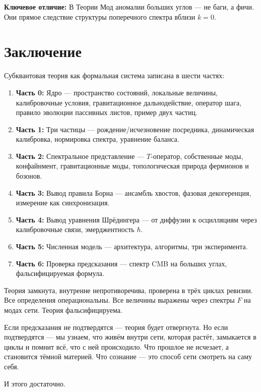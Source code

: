\documentclass[11pt,a4paper]{article}
\theoremstyle{definition}
\begin{document}
\textbf{Ключевое отличие:} В Теории Мод аномалии больших углов --- не баги, а фичи. Они прямое следствие структуры поперечного спектра вблизи $k = 0$.

\newpage
\section*{Заключение}

Субквантовая теория как формальная система записана в шести частях:

\begin{enumerate}
    \item \textbf{Часть 0:} Ядро --- пространство состояний, локальные величины, калибровочные условия, гравитационное дальнодействие, оператор шага, правило эволюции пассивных листов, пример двух частиц.
    \item \textbf{Часть 1:} Три частицы --- рождение/исчезновение посредника, динамическая калибровка, нормировка спектра, уравнение баланса.
    \item \textbf{Часть 2:} Спектральное представление --- $T$-оператор, собственные моды, конфайнмент, гравитационные моды, топологическая природа фермионов и бозонов.
    \item \textbf{Часть 3:} Вывод правила Борна --- ансамбль хвостов, фазовая декогеренция, измерение как синхронизация.
    \item \textbf{Часть 4:} Вывод уравнения Шрёдингера --- от диффузии к осцилляциям через калибровочные связи, эмерджентность $\hbar$.
    \item \textbf{Часть 5:} Численная модель --- архитектура, алгоритмы, три эксперимента.
    \item \textbf{Часть 6:} Проверка предсказания --- спектр CMB на больших углах, фальсифицируемая формула.
\end{enumerate}

Теория замкнута, внутренне непротиворечива, проверена в трёх циклах ревизии. Все определения операциональны. Все величины выражены через спектры $F$ на модах сети. Теория фальсифицируема.

Если предсказания не подтвердятся --- теория будет отвергнута. Но если подтвердятся --- мы узнаем, что живём внутри сети, которая растёт, замыкается в циклы и помнит всё, что с ней происходило. Что прошлое не исчезает, а становится тёмной материей. Что сознание --- это способ сети смотреть на саму себя.

И этого достаточно.
\end{document}
